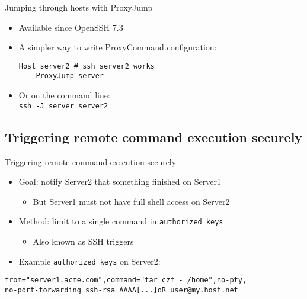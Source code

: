 \documentclass[11pt,final,usepdftitle=false]{beamer}
\begin{document}
\begin{frame}[fragile]{Jumping through hosts with ProxyJump}
	\hbr
\begin{itemize}
\item Available since OpenSSH 7.3
\item A simpler way to write ProxyCommand configuration:
\begin{lstlisting}[basicstyle=\ttfamily\small,escapeinside={||}]
Host server2 # ssh server2 works
    ProxyJump server
\end{lstlisting}\vspace{-0.2em}
\hbr
\item Or on the command line:\\
	\texttt{ssh -J server server2}
	\end{itemize}
\end{frame}

\subsection{Triggering remote command execution securely}
\begin{frame}[fragile]{Triggering remote command execution securely}
\begin{itemize}
\item Goal: notify Server2 that something finished on Server1
	\begin{itemize}
		\item But Server1 must not have full shell access on Server2
	\end{itemize}
	\hbr
\item Method: limit to a single command in \texttt{authorized\_keys}
	\begin{itemize}
		\item Also known as SSH triggers
	\end{itemize}
\hbr
\item Example \texttt{authorized\_keys} on Server2:
\end{itemize}
\begin{lstlisting}[basicstyle=\ttfamily\small,escapeinside={||}]
from="server1.acme.com",command="tar czf - /home",no-pty,
no-port-forwarding ssh-rsa AAAA[...]oR user@my.host.net
\end{lstlisting}
\end{frame}
\end{document}
